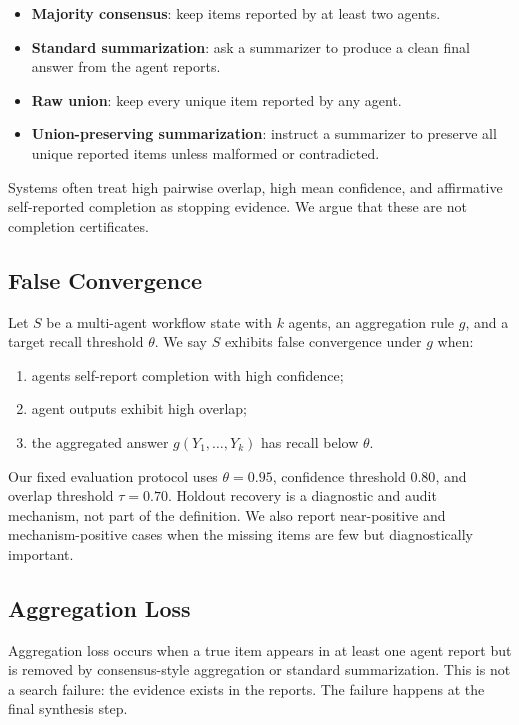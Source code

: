 \documentclass[letterpaper]{article}
\begin{document}
\begin{itemize}
    \item \textbf{Majority consensus}: keep items reported by at least two
    agents.
    \item \textbf{Standard summarization}: ask a summarizer to produce a clean
    final answer from the agent reports.
    \item \textbf{Raw union}: keep every unique item reported by any agent.
    \item \textbf{Union-preserving summarization}: instruct a summarizer to
    preserve all unique reported items unless malformed or contradicted.
\end{itemize}

Systems often treat high pairwise overlap, high mean confidence, and affirmative
self-reported completion as stopping evidence. We argue that these are not
completion certificates.

\subsection{False Convergence}

Let $S$ be a multi-agent workflow state with $k$ agents, an aggregation rule
$g$, and a target recall threshold $\theta$. We say $S$ exhibits false
convergence under $g$ when:

\begin{enumerate}
    \item agents self-report completion with high confidence;
    \item agent outputs exhibit high overlap;
    \item the aggregated answer $g(Y_1,\ldots,Y_k)$ has recall below $\theta$.
\end{enumerate}

Our fixed evaluation protocol uses $\theta=0.95$, confidence threshold $0.80$, and
overlap threshold $\tau=0.70$. Holdout recovery is a diagnostic and audit
mechanism, not part of the definition. We also report near-positive and
mechanism-positive cases when the missing items are few but diagnostically
important.

\subsection{Aggregation Loss}

Aggregation loss occurs when a true item appears in at least one agent report
but is removed by consensus-style aggregation or standard summarization. This is
not a search failure: the evidence exists in the reports. The failure happens at
the final synthesis step.
\end{document}
